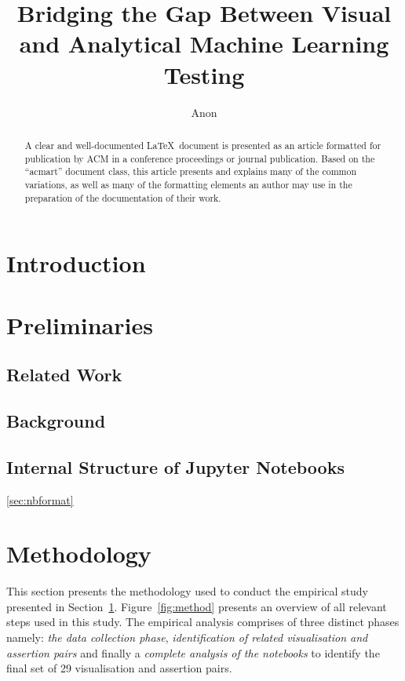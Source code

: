 \documentclass[acmsmall,screen,review,anonymous]{acmart}
\begin{document}
\title{Bridging the Gap Between Visual and Analytical Machine Learning Testing}

\author{Anon}

\begin{abstract}
  A clear and well-documented \LaTeX\ document is presented as an
  article formatted for publication by ACM in a conference proceedings
  or journal publication. Based on the ``acmart'' document class, this
  article presents and explains many of the common variations, as well
  as many of the formatting elements an author may use in the
  preparation of the documentation of their work.
\end{abstract}

\maketitle

\section{Introduction}\label{sec:intro}

\section{Preliminaries}\label{sec:prelim}
\subsection{Related Work}\label{sec:related}
\subsection{Background}\label{sec:background}
\subsection{Internal Structure of Jupyter Notebooks}\ref{sec:nbformat}



\section{Methodology}\label{sec:method}
This section presents the methodology used to conduct the empirical
study presented in Section~\ref{sec:intro}. Figure~\ref{fig:method}
presents an overview of all relevant steps used in this study. The
empirical analysis comprises of three distinct phases namely:
\textit{the data collection phase}, \textit{identification of related
visualisation and assertion pairs} and finally a \textit{complete
analysis of the notebooks} to identify the final set of 29
visualisation and assertion pairs.
\end{document}
